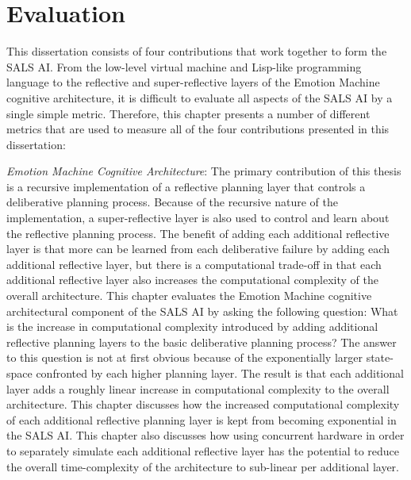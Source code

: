 \chapter{Evaluation}
\label{chapter:evaluation}

This dissertation consists of four contributions that work together to
form the SALS AI.  From the low-level virtual machine and Lisp-like
programming language to the reflective and super-reflective layers of
the Emotion Machine cognitive architecture, it is difficult to
evaluate all aspects of the SALS AI by a single simple metric.
Therefore, this chapter presents a number of different metrics that
are used to measure all of the four contributions presented in this
dissertation:
\begin{packed_enumerate}
\item{\emph{Emotion Machine Cognitive Architecture}: The primary
  contribution of this thesis is a recursive implementation of a
  reflective planning layer that controls a deliberative planning
  process.  Because of the recursive nature of the implementation, a
  super-reflective layer is also used to control and learn about the
  reflective planning process.  The benefit of adding each additional
  reflective layer is that more can be learned from each deliberative
  failure by adding each additional reflective layer, but there is a
  computational trade-off in that each additional reflective layer
  also increases the computational complexity of the overall
  architecture.  This chapter evaluates the Emotion Machine cognitive
  architectural component of the SALS AI by asking the following
  question: What is the increase in computational complexity
  introduced by adding additional reflective planning layers to the
  basic deliberative planning process?  The answer to this question is
  not at first obvious because of the exponentially larger state-space
  confronted by each higher planning layer.  The result is that each
  additional layer adds a roughly linear increase in computational
  complexity to the overall architecture.  This chapter discusses how
  the increased computational complexity of each additional reflective
  planning layer is kept from becoming exponential in the SALS AI.
  This chapter also discusses how using concurrent hardware in order
  to separately simulate each additional reflective layer has the
  potential to reduce the overall time-complexity of the architecture
  to sub-linear per additional layer.}

\end{packed_enumerate}
